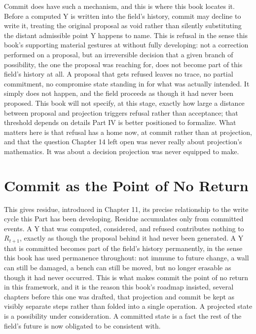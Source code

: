 Commit does have such a mechanism, and this is where this book locates it. Before a computed Y is written into the field's history, commit may decline to write it, treating the original proposal as void rather than silently substituting the distant admissible point Y happens to name. This is refusal in the sense this book's supporting material gestures at without fully developing: not a correction performed on a proposal, but an irreversible decision that a given branch of possibility, the one the proposal was reaching for, does not become part of this field's history at all. A proposal that gets refused leaves no trace, no partial commitment, no compromise state standing in for what was actually intended. It simply does not happen, and the field proceeds as though it had never been proposed. This book will not specify, at this stage, exactly how large a distance between proposal and projection triggers refusal rather than acceptance; that threshold depends on details Part IV is better positioned to formalize. What matters here is that refusal has a home now, at commit rather than at projection, and that the question Chapter 14 left open was never really about projection's mathematics. It was about a decision projection was never equipped to make.

\section{Commit as the Point of No Return}

This gives residue, introduced in Chapter 11, its precise relationship to the write cycle this Part has been developing. Residue accumulates only from committed events. A Y that was computed, considered, and refused contributes nothing to \(R_{t+1}\), exactly as though the proposal behind it had never been generated. A Y that is committed becomes part of the field's history permanently, in the sense this book has used permanence throughout: not immune to future change, a wall can still be damaged, a bench can still be moved, but no longer erasable as though it had never occurred. This is what makes commit the point of no return in this framework, and it is the reason this book's roadmap insisted, several chapters before this one was drafted, that projection and commit be kept as visibly separate steps rather than folded into a single operation. A projected state is a possibility under consideration. A committed state is a fact the rest of the field's future is now obligated to be consistent with.

